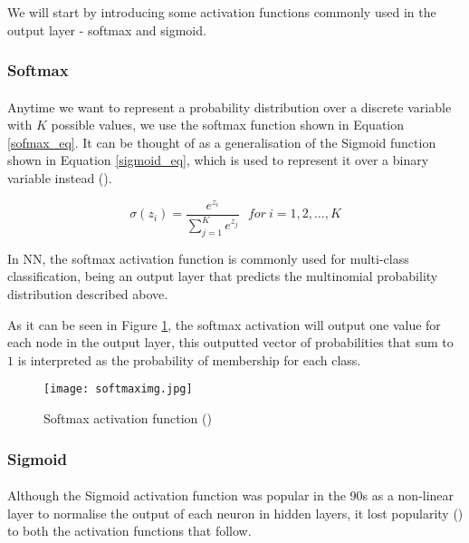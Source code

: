 We will start by introducing some activation functions commonly used in the output layer - softmax and sigmoid.

\subsubsection{Softmax}
\paragraph{}
Anytime we want to represent a probability distribution over a discrete variable with $K$ possible values, we use the softmax function shown in Equation \ref{sofmax_eq}. It can be thought of as a generalisation of the Sigmoid function shown in Equation \ref{sigmoid_eq}, which is used to represent it over a binary variable instead (\cite{GoodBengCour16}).

\begin{equation}
    \label{sofmax_eq}
    \sigma(z_i) = \frac{e^{z_{i}}}{\sum_{j=1}^K e^{z_{j}}} \ \ \ for\ i=1,2,\dots,K
\end{equation}

In \gls{NN}, the softmax activation function is commonly used for multi-class classification, being an output layer that predicts the multinomial probability distribution described above.

As it can be seen in Figure \ref{fig_softmax}, the softmax activation will output one value for each node in the output layer, this outputted vector of probabilities that sum to $1$ is interpreted as the probability of membership for each class.

\begin{figure}[hbt!]
    \centering
    \texttt{[image: softmaximg.jpg]}
    \caption{Softmax activation function (\cite{softmaxpic})}
    \label{fig_softmax}
\end{figure}

\subsubsection{Sigmoid}
\paragraph{}
Although the Sigmoid activation function was popular in the 90s as a non-linear layer to normalise the output of each neuron in hidden layers, it lost popularity (\cite{GoodBengCour16}) to both the activation functions that follow.

